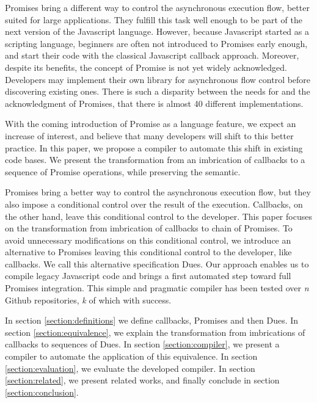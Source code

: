 Promises bring a different way to control the asynchronous execution flow, better suited for large applications.
They fulfill this task well enough to be part of the next version of the Javascript language.
However, because Javascript started as a scripting language, beginners are often not introduced to Promises early enough, and start their code with the classical Javascript callback approach.
Moreover, despite its benefits, the concept of Promise is not yet widely acknowledged.
Developers may implement their own library for asynchronous flow control before discovering existing ones.%
There is such a disparity between the needs for and the acknowledgment of Promises, that there is almost 40 different implementations.

With the coming introduction of Promise as a language feature, we expect an increase of interest, and believe that many developers will shift to this better practice.
In this paper, we propose a compiler to automate this shift in existing code bases.
We present the transformation from an imbrication of callbacks to a sequence of Promise operations, while preserving the semantic.

Promises bring a better way to control the asynchronous execution flow, but they also impose a conditional control over the result of the execution.
Callbacks, on the other hand, leave this conditional control to the developer.
This paper focuses on the transformation from imbrication of callbacks to chain of Promises.
To avoid unnecessary modifications on this conditional control, we introduce an alternative to Promises leaving this conditional control to the developer, like callbacks.
We call this alternative specification Dues.
Our approach enables us to compile legacy Javascript code and brings a first automated step toward full Promises integration.
This simple and pragmatic compiler has been tested over \textit{n} Github repositories, \textit{k} of which with success. 

In section \ref{section:definitions} we define callbacks, Promises and then Dues.
In section \ref{section:equivalence}, we explain the transformation from imbrications of callbacks to sequences of Dues.
In section \ref{section:compiler}, we present a compiler to automate the application of this equivalence.
In section \ref{section:evaluation}, we evaluate the developed compiler.
In section \ref{section:related}, we present related works, and finally conclude in section \ref{section:conclusion}.